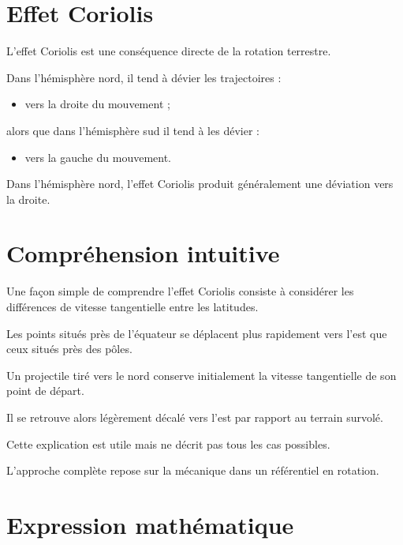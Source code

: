 \section{Effet Coriolis}

L'effet Coriolis est une conséquence directe de la rotation terrestre.

Dans l'hémisphère nord, il tend à dévier les trajectoires :

\begin{itemize}
    \item vers la droite du mouvement ;
\end{itemize}

alors que dans l'hémisphère sud il tend à les dévier :

\begin{itemize}
    \item vers la gauche du mouvement.
\end{itemize}

\begin{aretenir}

Dans l'hémisphère nord, l'effet Coriolis produit généralement une déviation
vers la droite.

\end{aretenir}

\section{Compréhension intuitive}

Une façon simple de comprendre l'effet Coriolis consiste à considérer les
différences de vitesse tangentielle entre les latitudes.

Les points situés près de l'équateur se déplacent plus rapidement vers l'est
que ceux situés près des pôles.

Un projectile tiré vers le nord conserve initialement la vitesse tangentielle
de son point de départ.

Il se retrouve alors légèrement décalé vers l'est par rapport au terrain
survolé.

Cette explication est utile mais ne décrit pas tous les cas possibles.

L'approche complète repose sur la mécanique dans un référentiel en rotation.

\section{Expression mathématique}

